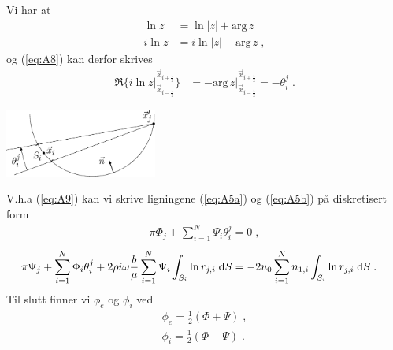 \documentclass[a4paper,norsk]{article}
\begin{document}
\noindent\begin{minipage}{.45\textwidth}
Vi har at
\begin{align*}
  \ln z &= \ln|z| + \mathrm{arg}\,z \\
  i\ln z &= i\ln|z| - \mathrm{arg}\,z \;,
\end{align*}
og (\ref{eq:A8}) kan derfor skrives
\begin{align}\label{eq:A9}
  \Re \{i\ln z |_{\vec{x}_{i-\frac{1}{2}}}^{\vec{x}_{i+\frac{1}{2}}}\} &=
            -\mathrm{arg}\,z |_{\vec{x}_{i-\frac{1}{2}}}^{\vec{x}_{i+\frac{1}{2}}}
        = -\theta^j_i \;.
\end{align}
\end{minipage}\hfill
\begin{minipage}{.45\textwidth}
  \centering
  \includegraphics[width=5cm]{theta_flux.eps}
\end{minipage}
\newpage
V.h.a (\ref{eq:A9}) kan vi skrive ligningene (\ref{eq:A5a}) og (\ref{eq:A5b}) på
diskretisert form
\begin{align}\label{eq:A10a}
  \pi\Phi_j + \sum_{i=1}^{N}\Psi_i \theta_i^j = 0\;,
\end{align}
\begin{align}\label{eq:A10b}
  \pi\Psi_j + \sum_{i=1}^{N}\Phi_i \theta^j_i
     + 2\rho i\omega \frac{b}{\mu} \sum_{i=1}^{N} \Psi_i \int_{S_i}\ln r_{j,i}\;\mathrm{d} S
        &= -2u_0\sum_{i=1}^{N}n_{1,i}\int_{S_i}\ln r_{j,i} \;\mathrm{d} S \;.
\end{align}
Til slutt finner vi $\phi_e$ og $\phi_i$ ved
\begin{align*}
  \phi_e = \frac{1}{2}(\Phi + \Psi) \;, \\
  \phi_i = \frac{1}{2}(\Phi - \Psi) \;.
\end{align*}
\end{document}

